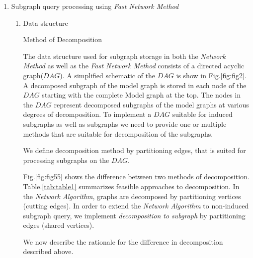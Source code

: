 \begin{enumerate}
\begin{enumerate}
\end{enumerate}

\item  Subgraph query processing using \textit{Fast Network Method}

\begin{enumerate}

\item Data structure


\begin{enumerate} Method of Decomposition

The data structure used for subgraph storage in both the \textit{Network Method} as well as the \textit{Fast Network Method} consists of a directed acyclic graph($DAG$). 
A simplified schematic of the $DAG$ is show in Fig.\ref{fig:fig2}.  
A decomposed subgraph of the model graph is stored in each node of the $DAG$ starting with the complete Model graph at the top.
The nodes in the $DAG$ represent decomposed subgraphs of the model graphs at various degrees of decomposition. To implement a $DAG$ suitable for induced subgraphs as well as subgraphs we need to provide one or multiple methods that are suitable for decomposition of the subgraphs.


We define decomposition method by partitioning edges, that is suited for processing subgraphs on the $DAG$.

Fig.\ref{fig:fig55} shows the difference between two methods of decomposition.
Table.\ref{tab:table1} summarizes feasible approaches to decomposition.
In the \textit{Network Algorithm}, graphs are decomposed by partitioning vertices (cutting edges).
In order to extend the \textit{Network Algorithm} to non-induced subgraph query, we implement \textit{decomposition to subgraph} by partitioning edges (shared vertices). 
 
We now describe the rationale for the difference in decomposition described above.


\end{enumerate}
\end{enumerate}
\end{enumerate}
